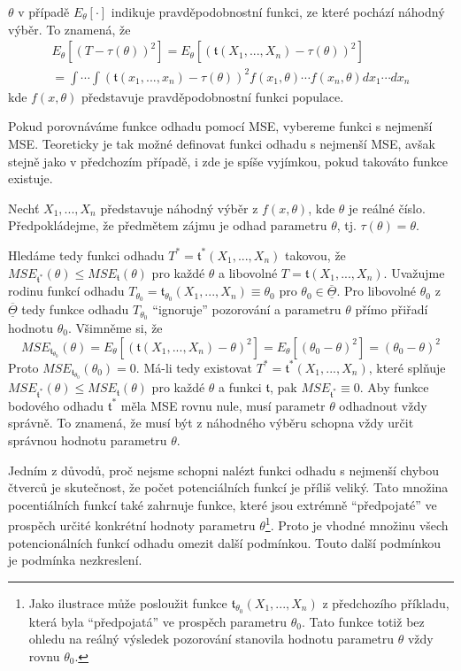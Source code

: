 $\theta$ v případě $E_{\theta}[\cdot]$ indikuje pravděpodobnostní funkci, ze které pochází náhodný výběr. To znamená, že
\begin{gather*}
E_{\theta}[(T - \tau(\theta))^2] = E_{\theta}[(\mathfrak{t}(X_1, ..., X_n) - \tau(\theta))^2]\\
= \int \cdots \int (\mathfrak{t}(x_1, ..., x_n) - \tau(\theta))^2 f(x_1, \theta) \cdots f(x_n, \theta) dx_1 \cdots dx_n
\end{gather*}
kde $f(x, \theta)$ představuje pravděpodobnostní funkci populace.

Pokud porovnáváme funkce odhadu pomocí MSE, vybereme funkci s nejmenší MSE. Teoreticky je tak možné definovat funkci odhadu s nejmenší MSE, avšak stejně jako v předchozím případě, i zde je spíše vyjímkou, pokud takováto funkce existuje.

\begin{example}
Nechť $X_1, ..., X_n$ představuje náhodný výběr z $f(x, \theta)$, kde $\theta$ je reálné číslo. Předpokládejme, že předmětem zájmu je odhad parametru $\theta$, tj. $\tau(\theta) = \theta$.

Hledáme tedy funkci odhadu $T^* = \mathfrak{t}^*(X_1, ..., X_n)$ takovou, že $MSE_{\mathfrak{t}^*}(\theta) \le MSE_{\mathfrak{t}}(\theta)$ pro každé $\theta$ a libovolné $T = \mathfrak{t}(X_1, ..., X_n)$. Uvažujme rodinu funkcí odhadu $T_{\theta_0} = \mathfrak{t}_{\theta_0}(X_1, ..., X_n) \equiv \theta_0$ pro $\theta_0 \in \overline{\underline{\Theta}}$. Pro libovolné $\theta_0$ z $\overline{\underline{\Theta}}$ tedy funkce odhadu $T_{\theta_0}$ ``ignoruje'' pozorování a parametru $\theta$ přímo přiřadí hodnotu $\theta_0$. Všimněme si, že
\begin{equation*}
MSE_{\mathfrak{t}_{\theta_0}}(\theta) = E_{\theta}[(\mathfrak{t}(X_1, ..., X_n) - \theta)^2] = E_{\theta}[(\theta_0 - \theta)^2] = (\theta_0 - \theta)^2
\end{equation*}
Proto $MSE_{\mathfrak{t}_{\theta_0}}(\theta_0) = 0$. Má-li tedy existovat $T^* = \mathfrak{t}^*(X_1, ..., X_n)$, které splňuje $MSE_{\mathfrak{t}^*}(\theta) \le MSE_{\mathfrak{t}}(\theta)$ pro každé $\theta$ a funkci $\mathfrak{t}$, pak $MSE_{\mathfrak{t}^*} \equiv 0$. Aby funkce bodového odhadu $\mathfrak{t}^*$ měla MSE rovnu nule, musí parametr $\theta$ odhadnout vždy správně. To znamená, že musí být z náhodného výběru schopna vždy určit správnou hodnotu parametru $\theta$.
\end{example}

Jedním z důvodů, proč nejsme schopni nalézt funkci odhadu s nejmenší chybou čtverců je skutečnost, že počet potenciálních funkcí je příliš veliký. Tato množina pocentiálních funkcí také zahrnuje funkce, které jsou extrémně ``předpojaté'' ve prospěch určité konkrétní hodnoty parametru $\theta$\footnote{Jako ilustrace může posloužit funkce $\mathfrak{t}_{\theta_0}(X_1, ..., X_n)$ z předchozího příkladu, která byla ``předpojatá'' ve prospěch parametru $\theta_0$. Tato funkce totiž bez ohledu na reálný výsledek pozorování stanovila hodnotu parametru $\theta$ vždy rovnu $\theta_0$.}. Proto je vhodné množinu všech potencionálních funkcí odhadu omezit další podmínkou. Touto další podmínkou je podmínka nezkreslení.

